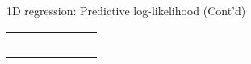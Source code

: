 \begin{frame}{1D regression: Predictive log-likelihood (Cont'd)}
\begin{table}[b]
\begin{tabular}{llrrrrr}
        \midrule
        \\
        \\
        \\
        \\
        \\
        \bottomrule
        \end{tabular}
        \end{table}
      
    
\end{frame}


